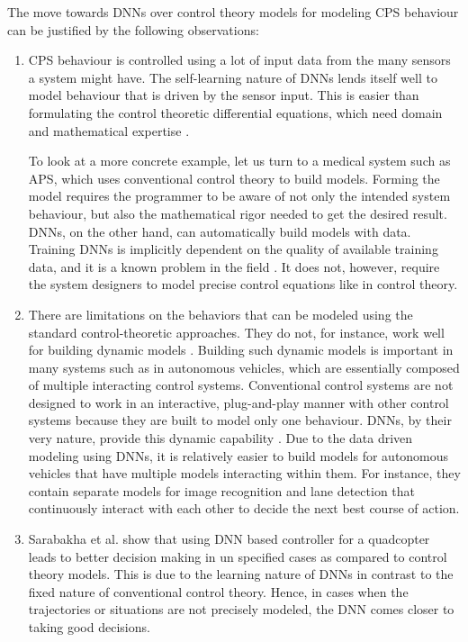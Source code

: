 The move towards DNNs over control theory models for modeling \ac{CPS} behaviour can be justified by the following observations:
\begin{enumerate}
	\item CPS behaviour is controlled using a lot of input data from the many sensors a system might have. The self-learning nature of DNNs lends itself well to model behaviour that is driven by the sensor input. This is easier than formulating the control theoretic differential equations, which need domain and mathematical expertise \cite{Aamir_2013}.
	
	
	To look at a more concrete example, let us turn to a medical system such as \ac{APS}, which uses conventional control theory to build models. 
	Forming the model requires the programmer to be aware of not only the intended system behaviour, but also the mathematical rigor needed to get the desired result. 
	DNNs, on the other hand, can automatically build models with data.
	Training DNNs is implicitly dependent on the quality of available training data, and it is a known problem in the field \cite{jabbar2015methods}. It does not, however, require the system designers to model precise control equations like in control theory.
	\item  There are limitations on the behaviors that can be modeled using the standard control-theoretic approaches. They do not, for instance, work well for building dynamic models \cite{article23}. Building such dynamic models is important in many systems such as in autonomous vehicles, which are essentially composed of multiple interacting control systems. Conventional control systems are not designed to work in an interactive, plug-and-play manner with other control systems because they are built to model only one behaviour. DNNs, by their very nature,  provide this dynamic capability \cite{article23}. 
	Due to the data driven modeling using DNNs, it is relatively easier to build models for autonomous vehicles that have multiple models interacting within them.
	For instance, they contain separate models for image recognition and lane detection that continuously interact with each other to decide the next best course of action.
	
	\item Sarabakha et al. \cite{sarabakha2019online} show that using \ac{DNN} based controller for a quadcopter leads to better decision making in un specified cases as compared to control theory models.
	This is due to the learning nature of \ac{DNN}s in contrast to the fixed nature of conventional control theory. 
	Hence, in cases when the trajectories or situations are not precisely modeled, the \ac{DNN} comes closer to taking good decisions.
\end{enumerate}




